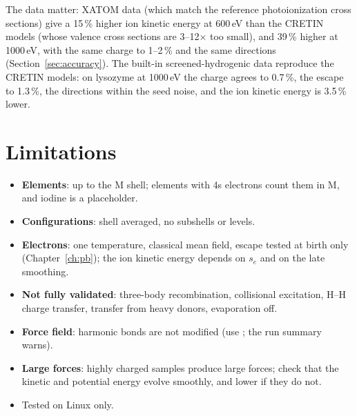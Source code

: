 The data matter: XATOM data (which match the reference photoionization cross sections) give a 15\,\% higher ion kinetic
energy at 600\,eV than the CRETIN models (whose valence cross sections are 3--12$\times$ too small), and 39\,\% higher at
1000\,eV, with the same charge to 1--2\,\% and the same directions (Section~\ref{sec:accuracy}).
The built-in screened-hydrogenic data reproduce the CRETIN models: on lysozyme at 1000\,eV the charge agrees to
0.7\,\%, the escape to 1.3\,\%, the directions within the seed noise, and the ion kinetic energy is 3.5\,\% lower.

\section{Limitations}

\begin{itemize}
  \item \textbf{Elements}: up to the M shell; elements with 4s electrons count them in M, and iodine is a placeholder.
  \item \textbf{Configurations}: shell averaged, no subshells or levels.
  \item \textbf{Electrons}: one temperature, classical mean field, escape tested at birth only
    (Chapter~\ref{ch:pb}); the ion kinetic energy depends on $s_e$ and on the late smoothing.
  \item \textbf{Not fully validated}: three-body recombination, collisional excitation, H--H charge transfer, transfer
    from heavy donors, evaporation off.
  \item \textbf{Force field}: harmonic bonds are not modified (use ; the run summary warns).
  \item \textbf{Large forces}: highly charged samples produce large forces; check that the kinetic and potential energy
    evolve smoothly, and lower  if they do not.
  \item Tested on Linux only.
\end{itemize}
